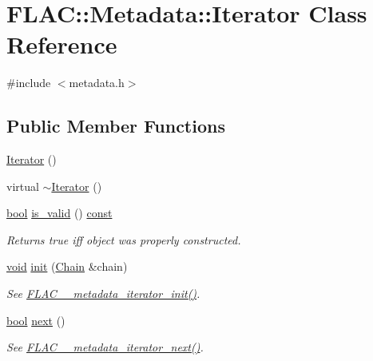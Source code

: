 \hypertarget{class_f_l_a_c_1_1_metadata_1_1_iterator}{}\section{F\+L\+AC\+:\+:Metadata\+:\+:Iterator Class Reference}
\label{class_f_l_a_c_1_1_metadata_1_1_iterator}


{\ttfamily \#include $<$metadata.\+h$>$}

\subsection*{Public Member Functions}
\begin{DoxyCompactItemize}
\item 
\hyperlink{class_f_l_a_c_1_1_metadata_1_1_iterator_adc365fb54425a0930cdad90232046108}{Iterator} ()
\item 
virtual \hyperlink{class_f_l_a_c_1_1_metadata_1_1_iterator_af65c2485039db9c831707f37375077c4}{$\sim$\+Iterator} ()
\item 
\hyperlink{mac_2config_2i386_2lib-src_2libsoxr_2soxr-config_8h_abb452686968e48b67397da5f97445f5b}{bool} \hyperlink{class_f_l_a_c_1_1_metadata_1_1_iterator_a9878c8330bdfb522dc2ce851b016d307}{is\+\_\+valid} () \hyperlink{getopt1_8c_a2c212835823e3c54a8ab6d95c652660e}{const} 
\begin{DoxyCompactList}\small\item\em Returns {\ttfamily true} iff object was properly constructed. \end{DoxyCompactList}\item 
\hyperlink{sound_8c_ae35f5844602719cf66324f4de2a658b3}{void} \hyperlink{class_f_l_a_c_1_1_metadata_1_1_iterator_ab5713af7318f10a46bd8b26ce586947c}{init} (\hyperlink{class_f_l_a_c_1_1_metadata_1_1_chain}{Chain} \&chain)
\begin{DoxyCompactList}\small\item\em See \hyperlink{group__flac__metadata__level2_ga4a5af69a1f19436b02f738eb8c97c959}{F\+L\+A\+C\+\_\+\+\_\+metadata\+\_\+iterator\+\_\+init()}. \end{DoxyCompactList}\item 
\hyperlink{mac_2config_2i386_2lib-src_2libsoxr_2soxr-config_8h_abb452686968e48b67397da5f97445f5b}{bool} \hyperlink{class_f_l_a_c_1_1_metadata_1_1_iterator_a1d2871fc1fdcc5dffee1eafd7019f4a0}{next} ()
\begin{DoxyCompactList}\small\item\em See \hyperlink{group__flac__metadata__level2_ga3997509ae7eeea3b208700cdbbbd97ed}{F\+L\+A\+C\+\_\+\+\_\+metadata\+\_\+iterator\+\_\+next()}. \end{DoxyCompactList}\item 

\end{DoxyCompactItemize}
